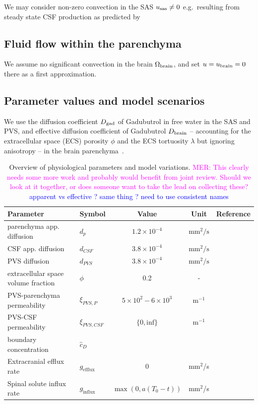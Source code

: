 \documentclass[fleqn,10pt]{wlscirep}
\newcommand{\rami}[1]{\textcolor{blue}{#1}}
\newcommand{\mer}[1]{\textcolor{magenta}{#1}}
\newcommand{\draft}[1]{\textcolor{gray}{#1}}
\begin{document}
We may consider non-zero convection in the SAS $u_{\rm sas} \not = 0$ e.g.~resulting from steady state CSF production as predicted by~\cite{hornkjol2022csf}

\draft{\lipsum[1]}

\subsection*{Fluid flow within the parenchyma}

We assume no significant convection in the brain $\Omega_{\rm brain}$, and set $u = u_{\rm brain} = 0$ there as a first approximation. 


\subsection*{Parameter values and model scenarios}
We use the diffusion coefficient $D_{\rm gad}$ of Gadubutrol in free water in the SAS and PVS, and effective diffusion coefficient of Gadubutrol $D_{\rm brain}$ -- accounting for the extracellular space (ECS) porosity $\phi$ and the ECS tortuosity $\lambda$ but ignoring anisotropy  -- in the brain parenchyma~\cite{hornkjol2022csf}. 
\begin{table}
  \begin{center}
    \begin{tabular}{ll|ccc}
      \toprule
      Parameter& Symbol & Value & Unit& Reference\\
      \midrule
         parenchyma app. diffusion&  $d_p$&  $1.2 \times 10^{-4}$& $\text{mm}^2/\text{s}$  & \cite{valnes2020apparent}\\
         CSF app. diffusion&  $d_{CSF}$&  $3.8 \times 10^{-4}$& $\text{mm}^2/\text{s}$ & \cite{valnes2020apparent}\\
         PVS diffusion&  $d_{PVS}$&  $3.8 \times 10^{-4}$& $\text{mm}^2/\text{s}$ & \cite{valnes2020apparent}\\
         extracellular space volume fraction& $\phi$& 0.2& - &\cite{nicholson1981ion} \\
         PVS-parenchyma permeability&  $\xi_{PVS,P}$& $5 \times 10^{2} - 6 \times 10^{3} $  & $\text{m}^{-1}$ & \cite{koch2023estimates} \\
         PVS-CSF permeability&  $\xi_{PVS,CSF}$& $\{0, \text{inf}\}$ & $\text{m}^{-1}$ & \\ 
         boundary concentration& $\hat{c}_D$& & &\\ \hline
         Extracranial efflux rate & $g_{\mathrm{efflux}}$  & 0 & mm$^2$/s \\
         Spinal solute influx rate & $g_{\mathrm{influx}}$ & $\max(0, a(T_0 - t))$  & mm$^2$/s
    \end{tabular}
  \end{center}
  \caption{Overview of physiological parameters and model variations. \mer{MER: This clearly needs some more work and probably would benefit from joint review. Should we look at it together, or does someone want to take the lead on collecting these?} \rami{apparent vs effective ? same thing ? need to use consistent names}}
  \label{tab:overview}
\end{table}
\end{document}
